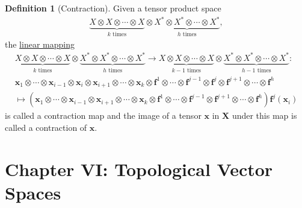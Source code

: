 \documentclass[letterpaper,12pt]{article}
\theoremstyle{plain}
\theoremstyle{plain}
\theoremstyle{definition}
\newtheorem{defn}{Definition}
\begin{document}
\begin{defn}[Contraction]\label{defcontr}
Given a tensor product space
\begin{align*}
\underbrace{X \otimes X \otimes \cdots \otimes X}_{k \text{ times}} \otimes \underbrace{X^* \otimes X^* \otimes \cdots \otimes X^*}_{h \text{ times}},
\end{align*}
the \hyperref[deflinfvs]{linear mapping}
\begin{align*}
\underbrace{X \otimes X \otimes \cdots \otimes X}_{k \text{ times}} \otimes \underbrace{X^* \otimes X^* \otimes \cdots \otimes X^*}_{h \text{ times}} \rightarrow \underbrace{X \otimes X \otimes \cdots \otimes X}_{k-1 \text{ times}} \otimes \underbrace{X^* \otimes X^* \otimes \cdots \otimes X^*}_{h-1 \text{ times}}:\\
\mathbf{x}_1 \otimes \cdots \otimes \mathbf{x}_{i-1} \otimes \mathbf{x}_i \otimes \mathbf{x}_{i+1} \otimes \cdots \otimes \mathbf{x}_{k} \otimes \mathbf{f}^{1} \otimes \cdots \otimes \mathbf{f}^{j-1} \otimes \mathbf{f}^j \otimes \mathbf{f}^{j+1} \otimes \cdots \otimes \mathbf{f}^{h} \\
\mapsto \left(\mathbf{x}_1 \otimes \cdots \otimes \mathbf{x}_{i-1} \otimes \mathbf{x}_{i+1} \otimes \cdots \otimes \mathbf{x}_{k} \otimes \mathbf{f}^{1} \otimes \cdots \otimes \mathbf{f}^{j-1} \otimes \mathbf{f}^{j+1} \otimes \cdots \otimes \mathbf{f}^{h}\right) \mathbf{f}^j(\mathbf{x}_i)
\end{align*}
is called a contraction map and the image of a tensor $\mathbf{x}$ in $\mathbf{X}$ under this map is called a contraction of $\mathbf{x}$.
\end{defn}
\clearpage

\section{Chapter VI: Topological Vector Spaces}
\end{document}
